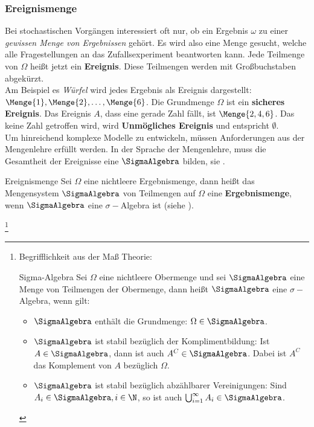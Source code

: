 \subsubsection{Ereignismenge}
Bei stochastischen Vorgängen interessiert oft nur, ob ein Ergebnis $\omega$ zu einer \textit{gewissen Menge von Ergebnissen} gehört. Es wird also eine Menge gesucht, welche alle Fragestellungen an das Zufallsexperiment beantworten kann. Jede Teilmenge von $\Omega$ heißt jetzt ein \textbf{Ereignis}. Diese Teilmengen werden mit Großbuchstaben abgekürzt. \\

Am Beispiel es \textit{Würfel} wird jedes Ergebnis als Ereignis dargestellt: $\Menge{1}, \Menge{2}, \dots, \Menge{6}$. Die Grundmenge $\Omega$ ist ein \textbf{sicheres Ereignis}. Das Ereignis $A$, dass eine gerade Zahl fällt, ist $\Menge{2,4,6}$. Das keine Zahl getroffen wird, wird \textbf{Unmögliches Ereignis} und entspricht $\emptyset$.\\

Um hinreichend komplexe Modelle zu entwickeln, müssen Anforderungen aus der Mengenlehre erfüllt werden. In der Sprache der Mengenlehre, muss die Gesamtheit der Ereignisse eine $\SigmaAlgebra$ bilden, sie .


\begin{Definition}{Ereignismenge}
	Sei $\Omega$ eine nichtleere Ergebnismenge, dann heißt das Mengensystem $\SigmaAlgebra$ von Teilmengen auf $\Omega$ eine \textbf{Ergebnismenge}, wenn $\SigmaAlgebra$ eine $\sigma-$Algebra ist (siehe ).
\end{Definition}\footnote{Begrifflichkeit aus der Maß Theorie: \begin{Lemma-Definition}{Sigma-Algebra}
	Sei $\Omega$ eine nichtleere Obermenge und sei $\SigmaAlgebra$ eine Menge von Teilmengen der Obermenge, dann heißt $\SigmaAlgebra$ eine $\sigma-$Algebra, wenn gilt:
	\begin{itemize}
		\item $\SigmaAlgebra$ enthält die Grundmenge: $\Omega\in \SigmaAlgebra$.
		\item $\SigmaAlgebra$ ist stabil bezüglich der Komplimentbildung: Ist $A\in\SigmaAlgebra$, dann ist auch $A^C\in\SigmaAlgebra$. Dabei ist $A^C$ das Komplement von $A$ bezüglich $\Omega$. 
		\item $\SigmaAlgebra$ ist stabil bezüglich abzählbarer Vereinigungen: Sind $A_i\in \SigmaAlgebra, i\in \N$, so ist auch $\bigcup_{i=1}^{\infty} A_i \in \SigmaAlgebra$.
	\end{itemize}
\end{Lemma-Definition}}

